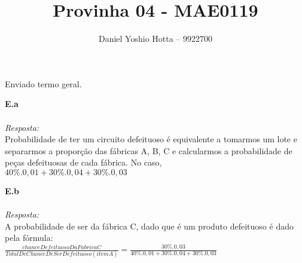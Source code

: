 \documentclass{article}
\begin{document}
	
	\title{Provinha 04 - MAE0119}
	\author{Daniel Yoshio Hotta – 9922700}
	
	\maketitle	
	
		Enviado termo geral.
	
	\textbf {E.a} 
	\\ \\
	\textit {Resposta:} \\
    
    Probabilidade de ter um circuito defeituoso é equivalente a tomarmos um lote e separarmos a proporção das fábricas A, B, C e calcularmos a probabilidade de peças defeituosas de cada fábrica. No caso,  \\
    
    $40\% . 0,01 + 30\% . 0,04 + 30\% . 0, 03$\\
    
    \maketitle	
    
    \textbf {E.b} 
    \\ \\
    \textit {Resposta:} \\
	
    A probabilidade de ser da fábrica C, dado que é um produto defeituoso é dado pela fórmula: \\
    
    $\frac{chance Defeituoso Da Fabrica C}{Total De Chance De Ser Defeituoso (item A)} = \frac{30\% .0,03}{40\% . 0,01 + 30\% . 0,04 + 30\% . 0, 03} $\\
    
	
\end{document}
